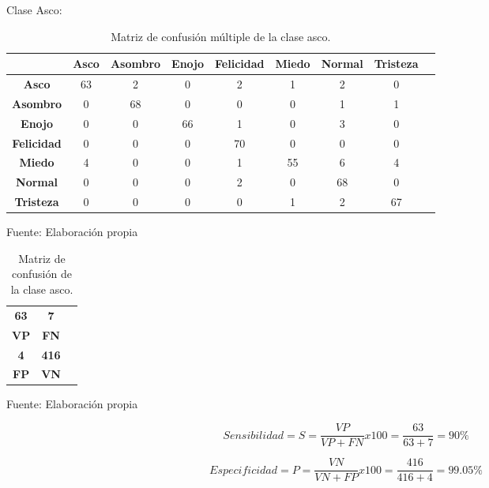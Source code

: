 \vskip 5cm
Clase Asco:

\begin{table}[ht!]
\centering
\caption{Matriz de confusión múltiple de la clase asco.} \vskip 0.1cm
\begin{tabular}{|c|c|c|c|c|c|c|c|c|} \hline
 & \bf Asco & \bf Asombro & \bf Enojo & \bf Felicidad & \bf Miedo & \bf Normal & \bf Tristeza \\ \hline
\bf Asco & 63 & 2 & 0 & 2 & 1 & 2 & 0 \\ \hline
\bf Asombro & 0 & 68 & 0 & 0 & 0 & 1 & 1 \\ \hline
\bf Enojo & 0 & 0 & 66 & 1 & 0 & 3 & 0 \\ \hline
\bf Felicidad & 0 & 0 & 0 & 70 & 0 & 0 & 0 \\ \hline
\bf Miedo & 4 & 0 & 0 & 1 & 55 & 6 & 4 \\ \hline
\bf Normal & 0 & 0 & 0 & 2 & 0 & 68 & 0 \\ \hline
\bf Tristeza & 0 & 0 & 0 & 0 & 1 & 2 & 67 \\ \hline

\end{tabular}
\begin{center}
{\small{Fuente: Elaboración propia}}
\end{center}
\end{table}


\begin{table}[ht!]
\centering
\caption{Matriz de confusión de la clase asco.} \vskip 0.1cm
\begin{tabular}{|c|c|c|} \hline
\bf 63 \par & \bf 7 \par \\
\bf VP & \bf FN \\ \hline
\bf 4 \par & \bf 416 \par \\ 
\bf FP & \bf VN \\ \hline 
\end{tabular}
\begin{center}
{\small{Fuente: Elaboración propia}}
\end{center}
\end{table}

\begin{equation}
Sensibilidad=S=\frac{VP}{VP+FN}x100=\frac{63}{63+7}=90\%
\end{equation}

\begin{equation}
Especificidad=P=\frac{VN}{VN+FP}x100=\frac{416}{416+4}=99.05\%
\end{equation}

